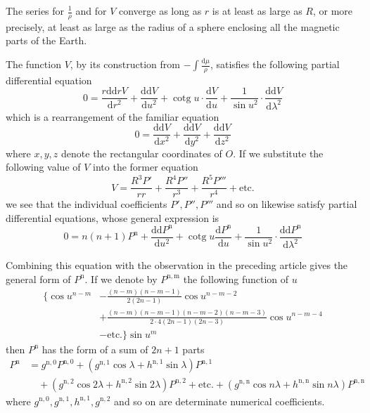 The series for $\frac1\rho$ and for $V$ converge as long as $r$ is at least as large as $R$, or more precisely, at least as large as the radius of a sphere enclosing all the magnetic parts of the Earth.

The function $V$, by its construction from $-\int\frac{\mathrm{d}\mu}{\rho}$, satisfies the following partial differential equation
\[
0=\frac{r\mathrm{d}\mathrm{d}rV}{\mathrm{d}r^2}+\frac{\mathrm{d}\mathrm{d}V}{\mathrm{d}u^2}+\operatorname{cotg}u\cdot\frac{\mathrm{d}V}{\mathrm{d}u}+\frac1{\sin u^2}\cdot\frac{\mathrm{d}\mathrm{d}V}{\mathrm{d}\lambda^2}
\]
which is a rearrangement of the familiar equation
\[
0=\frac{\mathrm{d}\mathrm{d}V}{\mathrm{d}x^2}+\frac{\mathrm{d}\mathrm{d}V}{\mathrm{d}y^2}+\frac{\mathrm{d}\mathrm{d}V}{\mathrm{d}z^2}
\]
where $x,y,z$ denote the rectangular coordinates of $O$. If we substitute the following value of $V$ into the former equation
\[
V=\frac{R^3P'}{rr}+\frac{R^4P''}{r^3}+\frac{R^5P'''}{r^4}+\text{etc.}
\]
we see that the individual coefficients $P',P'',P'''$ and so on likewise satisfy partial differential equations, whose general expression is
\[
0=n(n+1)P^{\mathrm{n}}+\frac{\mathrm{d}\mathrm{d}P^{\mathrm{n}}}{\mathrm{d}u^2}+\operatorname{cotg}u\frac{\mathrm{d}P^{\mathrm{n}}}{\mathrm{d}u}+\frac1{\sin u^2}\cdot\frac{\mathrm{d}\mathrm{d}P^{\mathrm{n}}}{\mathrm{d}\lambda^2}
\]

Combining this equation with the observation in the preceding article gives the general form of $P^{\mathrm{n}}$. If we denote by $P^{\mathrm{n,m}}$ the following function of $u$
\[
\begin{aligned}
\{\cos u^{n-m}&-\frac{(n-m)(n-m-1)}{2(2n-1)}\cos u^{n-m-2}\\
&+\frac{(n-m)(n-m-1)(n-m-2)(n-m-3)}{2\cdot4(2n-1)(2n-3)}\cos u^{n-m-4}\\&-\text{etc.}\}\sin u^m
\end{aligned}
\]
then $P^{\mathrm{n}}$ has the form of a sum of $2n+1$ parts
\[
\begin{aligned}
P^{\mathrm{n}}&=g^{\mathrm{n,0}}P^{\mathrm{n,0}}+(g^{\mathrm{n,1}}\cos\lambda+h^{\mathrm{n,1}}\sin\lambda)P^{\mathrm{n,1}}\\
&\quad+(g^{\mathrm{n,2}}\cos2\lambda+h^{\mathrm{n,2}}\sin2\lambda)P^{\mathrm{n,2}}+\text{etc.}+(g^{\mathrm{n,n}}\cos n\lambda+h^{\mathrm{n,n}}\sin n\lambda)P^{\mathrm{n,n}}
\end{aligned}
\]
where $g^{\mathrm{n,0}},g^{\mathrm{n,1}},h^{\mathrm{n,1}},g^{\mathrm{n,2}}$ and so on are determinate numerical coefficients.


